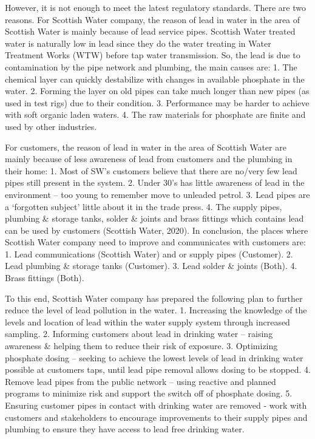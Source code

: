 \documentclass[11pt,twoside]{article}
\numberwithin{Theorem}{section}
\numberwithin{Definition}{section}
\numberwithin{Lemma}{section}
\numberwithin{Algorithm}{section}
\numberwithin{equation}{section}
\begin{document}
However, it is not enough to meet the latest regulatory standards. There are two reasons.
For Scottish Water company, the reason of lead in water in the area of Scottish Water is mainly because of lead service pipes. Scottish Water treated water is naturally low in lead since they do the water treating in Water Treatment Works (WTW) before tap water transmission. So, the lead is due to contamination by the pipe network and plumbing, the main causes are: 1. The chemical layer can quickly destabilize with changes in available phosphate in the water. 2. Forming the layer on old pipes can take much longer than new pipes (as used in test rigs) due to their condition. 3. Performance may be harder to achieve with soft organic laden waters. 4. The raw materials for phosphate are finite and used by other industries.

For customers, the reason of lead in water in the area of Scottish Water are mainly because of less awareness of lead from customers and the plumbing in their home: 1. Most of SW’s customers believe that there are no/very few lead pipes still present in the system. 2. Under 30’s has little awareness of lead in the environment – too young to remember move to unleaded petrol. 3. Lead pipes are a ‘forgotten subject’ little about it in the trade press. 4. The supply pipes, plumbing & storage tanks, solder & joints and brass fittings which contains lead can be used by customers (Scottish Water, 2020). 
In conclusion, the places where Scottish Water company need to improve and communicates with customers are: 1. Lead communications (Scottish Water) and or supply pipes (Customer). 2. Lead plumbing \& storage tanks (Customer). 3. Lead solder \& joints (Both). 4. Brass fittings (Both).

To this end, Scottish Water company has prepared the following plan to further reduce the level of lead pollution in the water. 1. Increasing the knowledge of the levels and location of lead within the water supply system through increased sampling. 2. Informing customers about lead in drinking water – raising awareness \& helping them to reduce their risk of exposure. 3. Optimizing phosphate dosing – seeking to achieve the lowest levels of lead in drinking water possible at customers taps, until lead pipe removal allows dosing to be stopped. 4. Remove lead pipes from the public network – using reactive and planned programs to minimize risk and support the switch off of phosphate dosing. 5. Ensuring customer pipes in contact with drinking water are removed - work with customers and stakeholders to encourage improvements to their supply pipes and plumbing to ensure they have access to lead free drinking water.
\end{document}
